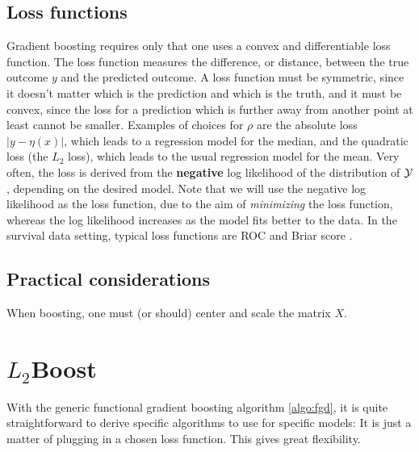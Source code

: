 \subsection{Loss functions}
Gradient boosting requires only that one uses a convex and differentiable loss function. The loss function measures the difference, or distance, between the true outcome $y$ and the predicted outcome. A loss function must be symmetric, since it doesn't matter which is the prediction and which is the truth, and it must be convex, since the loss for a prediction which is further away from another point at least cannot be smaller. Examples of choices for $\rho$ are the absolute loss $|y-\eta(x)|$, which leads to a regression model for the median, and the quadratic loss (the $L_2$ loss), which leads to the usual regression model for the mean. Very often, the loss is derived from the \textbf{negative} log likelihood of the distribution of $\mathcal{Y}$, depending on the desired model. Note that we will use the negative log likelihood as the loss function, due to the aim of \textit{minimizing} the loss function, whereas the log likelihood increases as the model fits better to the data. In the survival data setting, typical loss functions are ROC and Briar score \citep{bovelstadborgan}.

\subsection{Practical considerations}
When boosting, one must (or should) center and scale the matrix $X$.

\section{$L_2$Boost}
With the generic functional gradient boosting algorithm \eqref{algo:fgd}, it is quite straightforward to derive specific algorithms to use for specific models: It is just a matter of plugging in a chosen loss function. This gives great flexibility.

